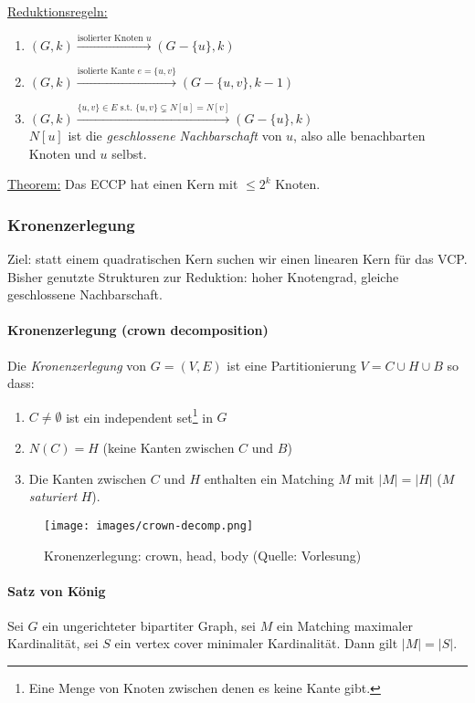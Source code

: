 \underline{Reduktionsregeln:}
\begin{enumerate}[label=(\roman*)]
    \item $(G, k) \xrightarrow{\text{isolierter Knoten } u} (G-\{ u \}, k)$
    \item $(G, k) \xrightarrow{\text{isolierte Kante } e=\{u,v\} } (G-\{ u,v \}, k-1)$
    \item $(G, k) \xrightarrow{\{u,v\} \in E \text{ s.t. } \{u,v\} \subsetneq N[u] = N[v] } (G-\{ u \}, k)$ \\
    $N[u]$ ist die \emph{geschlossene Nachbarschaft} von $u$, also alle benachbarten 
    Knoten und $u$ selbst.
\end{enumerate}

\underline{Theorem:} Das ECCP hat einen Kern mit $\leq 2^k$ Knoten.


\subsubsection{Kronenzerlegung}

Ziel: statt einem quadratischen Kern suchen wir einen linearen Kern für das VCP. \\
Bisher genutzte Strukturen zur Reduktion: hoher Knotengrad, gleiche geschlossene Nachbarschaft.

\paragraph{Kronenzerlegung (crown decomposition)}
Die \emph{Kronenzerlegung} von $G=(V,E)$ ist eine Partitionierung $V = C \cup H \cup B$ so dass:
\begin{enumerate}[label=(\roman*)]
    \item $C \neq \emptyset$ ist ein independent set\footnote{Eine 
    Menge von Knoten zwischen denen es keine Kante gibt.} in $G$
    \item $N(C) = H$ (keine Kanten zwischen $C$ und $B$)
    \item Die Kanten zwischen $C$ und $H$ enthalten ein Matching $M$ 
    mit $|M| = |H|$ ($M$ \emph{saturiert} $H$).
\end{enumerate}

\begin{figure}[h]
    \centering
    \texttt{[image: images/crown-decomp.png]}
    \caption{Kronenzerlegung: crown, head, body (Quelle: Vorlesung)}
    \label{fig:crown-decomp}
\end{figure}

\paragraph{Satz von König}
Sei $G$ ein ungerichteter bipartiter Graph, sei $M$ ein Matching maximaler Kardinalität,
sei $S$ ein vertex cover minimaler Kardinalität.
Dann gilt $|M| = |S|$.


